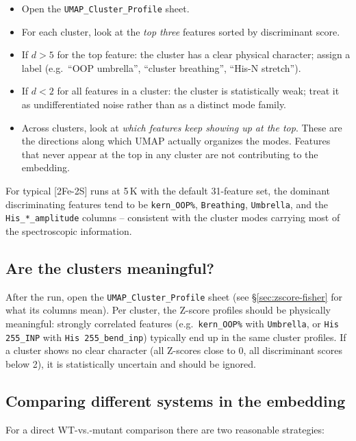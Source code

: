 \documentclass[11pt,a4paper,twoside]{article}
\theoremstyle{remark}
\begin{document}
\begin{itemize}\setlength{\itemsep}{2pt}
  \item Open the \texttt{UMAP\_Cluster\_Profile} sheet.
  \item For each cluster, look at the \emph{top three} features
        sorted by discriminant score.
  \item If $d > 5$ for the top feature: the cluster has a clear
        physical character; assign a label (e.g.\ ``OOP umbrella'',
        ``cluster breathing'', ``His-N stretch'').
  \item If $d < 2$ for all features in a cluster: the cluster is
        statistically weak; treat it as undifferentiated noise
        rather than as a distinct mode family.
  \item Across clusters, look at \emph{which features keep showing
        up at the top}. These are the directions along which UMAP
        actually organizes the modes. Features that never appear
        at the top in any cluster are not contributing to the
        embedding.
\end{itemize}

For typical [2Fe-2S] runs at 5\,K with the default 31-feature set,
the dominant discriminating features tend to be \texttt{kern\_OOP\%},
\texttt{Breathing}, \texttt{Umbrella}, and the
\texttt{His\_*\_amplitude} columns -- consistent with the cluster
modes carrying most of the spectroscopic information.

\subsection{Are the clusters meaningful?}

After the run, open the \texttt{UMAP\_Cluster\_Profile} sheet (see
\S\ref{sec:zscore-fisher} for what its columns mean). Per
cluster, the Z-score profiles should be physically meaningful:
strongly correlated features (e.g.\ \texttt{kern\_OOP\%} with
\texttt{Umbrella}, or \texttt{His 255\_INP} with
\texttt{His 255\_bend\_inp}) typically end up in the same cluster
profiles. If a cluster shows no clear character (all Z-scores close
to 0, all discriminant scores below 2), it is statistically
uncertain and should be ignored.

\subsection{Comparing different systems in the embedding}

For a direct WT-vs.-mutant comparison there are two reasonable
strategies:
\end{document}
